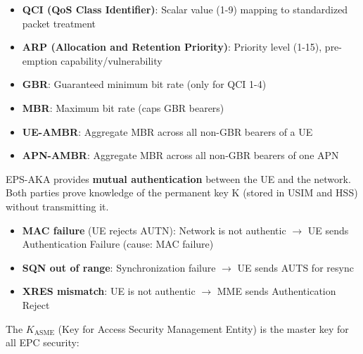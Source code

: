 \begin{itemize}
\tightlist
\item
  \textbf{QCI (QoS Class Identifier)}: Scalar value (1-9) mapping to standardized packet treatment
\item
  \textbf{ARP (Allocation and Retention Priority)}: Priority level (1-15), pre-emption capability/\allowbreak{}vulnerability
\item
  \textbf{GBR}: Guaranteed minimum bit rate (only for QCI 1-4)
\item
  \textbf{MBR}: Maximum bit rate (caps GBR bearers)
\item
  \textbf{UE-AMBR}: Aggregate MBR across all non-GBR bearers of a UE
\item
  \textbf{APN-AMBR}: Aggregate MBR across all non-GBR bearers of one APN
\end{itemize}




\CNchained{}

EPS-AKA provides \textbf{mutual authentication} between the UE and the network. Both parties prove knowledge of the permanent key K (stored in USIM and HSS) without transmitting it.




\begin{itemize}
\tightlist
\item
  \textbf{MAC failure} (UE rejects AUTN): Network is not authentic \ensuremath{\to} UE sends Authentication Failure (cause: MAC failure)
\item
  \textbf{SQN out of range}: Synchronization failure \ensuremath{\to} UE sends AUTS for resync
\item
  \textbf{XRES mismatch}: UE is not authentic \ensuremath{\to} MME sends Authentication Reject
\end{itemize}


The \textbf{\ensuremath{K_{\mathrm{ASME}}}} (Key for Access Security Management Entity) is the master key for all EPC security:

